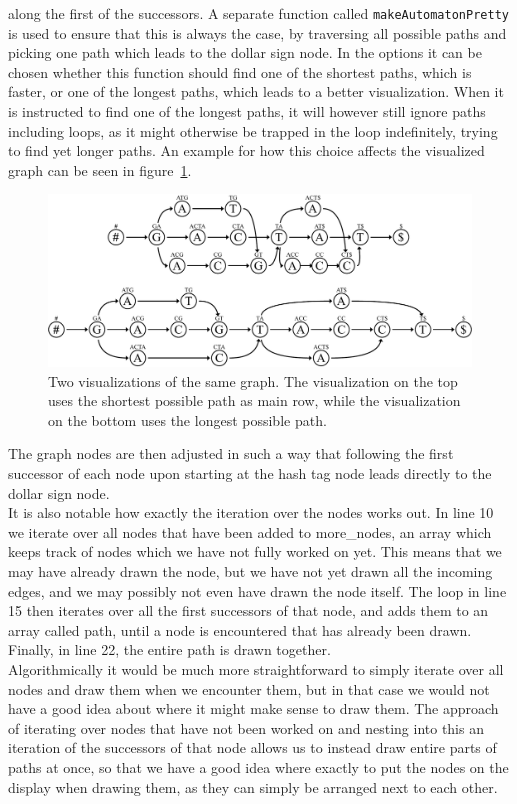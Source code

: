 \documentclass[a4paper,12pt,twoside,BCOR=10mm]{scrbook}
\begin{document}
along the first of the successors. 
A separate function called \texttt{makeAutomatonPretty} is used to ensure that this is always the case, 
by traversing all possible paths and picking one path which leads to the dollar sign node. 
In the options it can be chosen whether this function 
should find one of the shortest paths, which is faster, or one of the longest paths, 
which leads to a better visualization. 
When it is instructed to find one of the longest paths, it will however still ignore 
paths including loops, as it might otherwise be trapped in the loop indefinitely, 
trying to find yet longer paths. 
An example for how this choice affects 
the visualized graph can be seen in figure~\ref{fig:evo_fig_visualize_short_vs_long}.  
\begin{figure}[!htb]
\centering
\includegraphics[width=\textwidth]{evo_fig_visualize_short_vs_long.pdf}
\caption[Visualizations of graph with shortest and longest main rows]{Two visualizations of the same graph. The visualization on the top uses the shortest possible path as main row, while the visualization on the bottom uses the longest possible path.} \label{fig:evo_fig_visualize_short_vs_long}
\end{figure}
The graph nodes are then adjusted in such a way that following the first successor of each 
node upon starting at the hash tag node leads directly to the dollar sign node. \\
It is also notable how exactly the iteration over the nodes works out. 
In line 10 we iterate over all nodes that have been added to more\_nodes, 
an array which keeps track of nodes which we have not fully worked on yet. 
This means that we may have already drawn the node, but we have not yet 
drawn all the incoming edges, and we may possibly not even have drawn the node itself. 
The loop in line 15 then iterates over all the first successors of that node, 
and adds them to an array called path, until a node is encountered that has already been drawn. 
Finally, in line 22, the entire path is drawn together. \\
Algorithmically it would be much more straightforward to simply iterate over all nodes 
and draw them when we encounter them, but in that case we would not have a good idea about 
where it might make sense to draw them. The approach of iterating over nodes 
that have not been worked on and nesting into this an iteration of the successors of that node 
allows us to instead draw entire parts of paths at once, so that we have a good idea 
where exactly to put the nodes on the display when drawing them, as they can simply 
be arranged next to each other.
\end{document}
